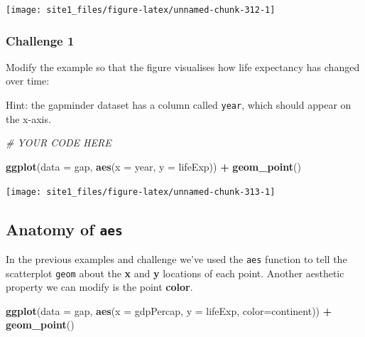 \documentclass[]{book}
\newenvironment{Shaded}{\begin{snugshade}}{\end{snugshade}}
\newcommand{\KeywordTok}[1]{\textcolor[rgb]{0.13,0.29,0.53}{\textbf{#1}}}
\newcommand{\DataTypeTok}[1]{\textcolor[rgb]{0.13,0.29,0.53}{#1}}
\newcommand{\StringTok}[1]{\textcolor[rgb]{0.31,0.60,0.02}{#1}}
\newcommand{\CommentTok}[1]{\textcolor[rgb]{0.56,0.35,0.01}{\textit{#1}}}
\newcommand{\OperatorTok}[1]{\textcolor[rgb]{0.81,0.36,0.00}{\textbf{#1}}}
\newcommand{\NormalTok}[1]{#1}
\begin{document}
\begin{center}\texttt{[image: site1\_files/figure-latex/unnamed-chunk-312-1]} \end{center}

\subsubsection*{Challenge 1}\label{challenge-1-1}

Modify the example so that the figure visualises how life expectancy has
changed over time:

Hint: the gapminder dataset has a column called \texttt{year}, which
should appear on the x-axis.

\begin{Shaded}
\begin{Highlighting}[]
\CommentTok{# YOUR CODE HERE}

\KeywordTok{ggplot}\NormalTok{(}\DataTypeTok{data =}\NormalTok{ gap, }\KeywordTok{aes}\NormalTok{(}\DataTypeTok{x =}\NormalTok{ year, }\DataTypeTok{y =}\NormalTok{ lifeExp)) }\OperatorTok{+}\StringTok{ }
\StringTok{  }\KeywordTok{geom_point}\NormalTok{()}
\end{Highlighting}
\end{Shaded}

\begin{center}\texttt{[image: site1\_files/figure-latex/unnamed-chunk-313-1]} \end{center}

\subsection{\texorpdfstring{Anatomy of
\texttt{aes}}{Anatomy of aes}}\label{anatomy-of-aes}

In the previous examples and challenge we've used the \texttt{aes}
function to tell the scatterplot \texttt{geom} about the \textbf{x} and
\textbf{y} locations of each point. Another aesthetic property we can
modify is the point \textbf{color}.

\begin{Shaded}
\begin{Highlighting}[]
\KeywordTok{ggplot}\NormalTok{(}\DataTypeTok{data =}\NormalTok{ gap, }\KeywordTok{aes}\NormalTok{(}\DataTypeTok{x =}\NormalTok{ gdpPercap, }\DataTypeTok{y =}\NormalTok{ lifeExp, }\DataTypeTok{color=}\NormalTok{continent)) }\OperatorTok{+}\StringTok{ }
\StringTok{  }\KeywordTok{geom_point}\NormalTok{()}
\end{Highlighting}
\end{Shaded}
\end{document}
